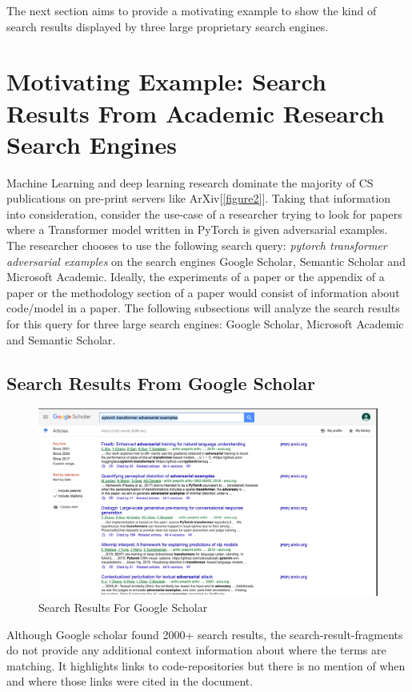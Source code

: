 The next section aims to provide a motivating example to show the kind of search results displayed by three large proprietary search engines.

\section{Motivating Example: Search Results From Academic Research Search Engines}
Machine Learning and deep learning research dominate the majority of CS publications on pre-print servers like ArXiv[\ref{figure2}].
Taking that information into consideration, consider the use-case of a researcher trying to look for papers where a Transformer\parencite{vaswani2017attention} model written in PyTorch\parencite{paszke2019pytorch} is given adversarial examples. 
The researcher chooses to use the following search query: \textit{pytorch transformer adversarial examples} on the search engines Google Scholar, Semantic Scholar and Microsoft Academic. 
Ideally, the experiments of a paper or the appendix of a paper or the methodology section of a paper would consist of information about code/model in a paper. 
The following subsections will analyze the search results for this query for three large search engines: Google Scholar, Microsoft Academic and Semantic Scholar. 
\pagebreak
\subsection{Search Results From Google Scholar}
\label{sr-g}

\begin{figure}[h]
    \centering
    \includegraphics[width=\maxwidth{\textwidth}]{src/images/google-scholar-example.png}
    \caption{Search Results For Google Scholar}
    \label{figure\arabic{figurecounter}}
\end{figure}
Although Google scholar found 2000+ search results, the search-result-fragments do not provide any additional context information about where the terms are matching. 
It highlights links to code-repositories but there is no mention of when and where those links were cited in the document. 

